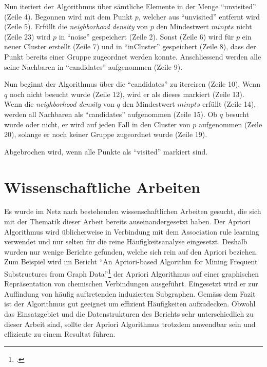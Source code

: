 Nun iteriert der Algorithmus über sämtliche Elemente in der Menge "`unvisited"' (Zeile 4). Begonnen wird mit dem Punkt $p$, welcher aus "`unvisited"' entfernt wird (Zeile 5). Erfüllt die \textit{neighborhood density} von $p$ den Mindestwert $minpts$ nicht (Zeile 23) wird $p$ in "`noise"' gespeichert (Zeile 2). Sonst (Zeile 6) wird für $p$ ein neuer Cluster erstellt (Zeile 7) und in "`inCluster"' gespeichert (Zeile 8), dass der Punkt bereits einer Gruppe zugeordnet werden konnte. Anschliessend werden alle seine Nachbaren in "`candidates"' aufgenommen (Zeile 9).

Nun beginnt der Algorithmus über die "`candidates"' zu itereiren (Zeile 10). Wenn $q$ noch nicht besucht wurde (Zeile 12), wird er als dieses markiert (Zeile 13). Wenn die \textit{neighborhood density} von $q$ den Mindestwert $minpts$ erfüllt (Zeile 14), werden all Nachbaren als "`candidates"' aufgenommen (Zeile 15). Ob $q$ besucht wurde oder nicht, er wird auf jeden Fall in den Cluster von $p$ aufgenommen (Zeile 20), solange er noch keiner Gruppe zugeordnet wurde (Zeile 19).


Abgebrochen wird, wenn alle Punkte als "`visited"' markiert sind.

\section{Wissenschaftliche Arbeiten}
Es wurde im Netz nach bestehenden wissenschaftlichen Arbeiten gesucht, die sich mit der Thematik dieser Arbeit bereits auseinandergesetzt haben. Der Apriori Algorithmus wird üblicherweise in Verbindung mit dem Association rule learning verwendet und nur selten für die reine Häufigkeitsanalyse eingesetzt. Deshalb wurden nur wenige Berichte gefunden, welche sich rein auf den Apriori beziehen. 
Zum Beispiel wird im Bericht "`An Apriori-based Algorithm for Mining Frequent Substructures from Graph Data"'\footcite{agm} der Apriori Algorithmus auf einer graphischen Repräsentation von chemischen Verbindungen ausgeführt. Eingesetzt wird er zur Auffindung von häufig auftretenden induzierten Subgraphen. Gemäss dem Fazit ist der Algorithmus gut geeignet um effizient Häufigkeiten aufzudecken. Obwohl das Einsatzgebiet und die Datenstrukturen des Berichts sehr unterschiedlich zu dieser Arbeit sind, sollte der Apriori Algorithmus trotzdem anwendbar sein und effiziente zu einem Resultat führen.

